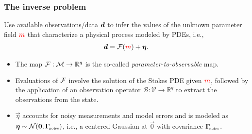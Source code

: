 \documentclass[10pt,final,xcolor=dvipsnames]{beamer}
\begin{document}
\begin{frame}
  \frametitle{The inverse problem}

  Use available observations/data $\boldsymbol{d}$ to infer the
  values of the unknown parameter field $\textcolor{red}{{m}}$ that
  characterize a physical process modeled by PDEs, i.e.,
      \begin{align*}
        \boldsymbol{d} = \mathcal{F}(\textcolor{red}{{m}}) + \boldsymbol{\eta}.
      \end{align*}
      \vspace{-0.2in}
      \begin{itemize}
      \item The map $\mathcal{F}: \mathcal{M} \to \mathbb{R}^q$ is the so-called
        {\it parameter-to-observable} map.
      \item Evaluations of $\mathcal{F}$ involve the solution of the Stokes
        PDE given $\textcolor{red}{{m}}$, followed by the application of an
        observation operator $\mathcal{B}: \mathcal{V} \to
        \mathbb{R}^q$ to extract the observations from the state.
      \item $\vec{\eta}$ accounts for noisy measurements and model
        errors and is modeled as $\boldsymbol{\eta} \sim
        \mathcal{N}\!\left( {\boldsymbol{0}}, {\boldsymbol{\Gamma}_{\!\mbox{\tiny noise}}}\right)$, i.e., a centered Gaussian at $\vec{0}$
        with covariance $\boldsymbol{\Gamma}_{\!\mbox{\tiny noise}}$.
      \end{itemize}
\end{frame}
\end{document}
